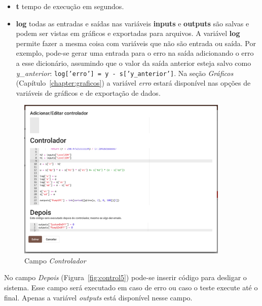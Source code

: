 \begin{itemize}
    \item \textbf{t} tempo de execução em segundos.
    \item \textbf{log} todas as entradas e saídas nas variáveis \textbf{inputs}
                       e \textbf{outputs} são salvas e podem ser vistas em
                       gráficos e exportadas para arquivos. A variável
                       \textbf{log} permite fazer a mesma coisa com variáveis
                       que não são entrada ou saída. Por exemplo, pode-se gerar
                       uma entrada para o erro na saída adicionando o erro a
                       esse dicionário, assumindo que o valor da saída anterior
                       esteja salvo como \textit{y\_anterior}:
                       \texttt{log['erro'] = y - s['y_anterior']}.
                       Na seção \textit{Gráficos}
                       (Capítulo~\ref{chapter:graficos}) a variável
                       \textit{erro} estará disponível nas opções de variáveis
                       de gráficos e de exportação de dados.
\end{itemize}

\begin{figure}[ht!]
    \centering
    \includegraphics[width=0.9\textwidth]{imgs/control4}
    \caption[Campo \textit{Controlador}]{Campo \textit{Controlador}}%
    \label{fig:control4}
\end{figure}

No campo \textit{Depois} (Figura~\ref{fig:control5}) pode-se inserir código para
desligar o sistema. Esse campo será executado em caso de erro ou caso o teste
execute até o final. Apenas a variável \textit{outputs} está disponível nesse
campo.


